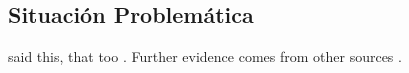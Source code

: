 \subsection{Situación Problemática}

\Textcite{vonDavier2011} said this, that
too \parencite{vonDavier2011,Lassen2006}.  Further evidence comes from
other sources \parencite{Shotton1989,Lassen2006}.
